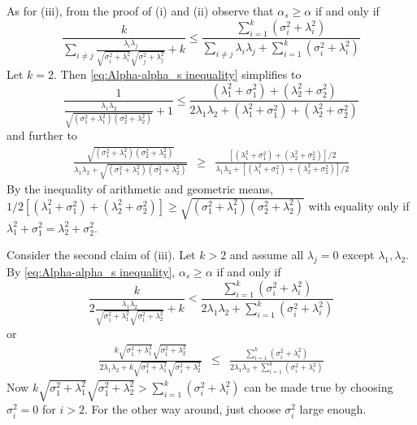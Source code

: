 \documentclass{article}
\makeatletter
\theoremstyle{plain}
\theoremstyle{plain}
\theoremstyle{definition}
\theoremstyle{remark}
\theoremstyle{definition}
\theoremstyle{plain}
\theoremstyle{plain}
\theoremstyle{definition}
\newenvironment{proof}[1][\protect\proofname]{\par
	\normalfont\topsep6\p@\@plus6\p@\relax
	\trivlist
	\itemindent\parindent
	\item[\hskip\labelsep\scshape #1]\ignorespaces
}{%
	\endtrivlist\@endpefalse
}
\providecommand{\proofname}{Proof}
\makeatother
\begin{document}
\begin{proof}[Proof of Proposition \ref{prop:Reliabilities.}]
As for (iii), from the proof of (i) and (ii) observe that $\alpha_{s}\geq\alpha$
if and only if
\begin{equation}
\label{eq:Alpha-alpha_s inequality}
\frac{k}{\sum_{i\neq j}\frac{\lambda_{i}\lambda_{j}}{\sqrt{\sigma_{i}^{2}+\lambda_{i}^{2}}\sqrt{\sigma_{j}^{2}+\lambda_{j}^{2}}}+k}\leq\frac{\sum_{i=1}^{k}\left(\sigma_{i}^{2}+\lambda_{i}^{2}\right)}{\sum_{i\neq j}\lambda_{i}\lambda_{j}+\sum_{i=1}^{k}\left(\sigma_{i}^{2}+\lambda_{i}^{2}\right)}
\end{equation}
Let $k=2$. Then \eqref{eq:Alpha-alpha_s inequality} simplifies to
\[
\frac{1}{\frac{\lambda_{1}\lambda_{2}}{\sqrt{\left(\sigma_{1}^{2}+\lambda_{1}^{2}\right)\left(\sigma_{2}^{2}+\lambda_{2}^{2}\right)}}+1}\leq\frac{\left(\lambda_{1}^{2}+\sigma_{1}^{2}\right)+\left(\lambda_{2}^{2}+\sigma_{2}^{2}\right)}{2\lambda_{1}\lambda_{2}+\left(\lambda_{1}^{2}+\sigma_{1}^{2}\right)+\left(\lambda_{2}^{2}+\sigma_{2}^{2}\right)}
\]
and further to
\begin{eqnarray*}
\frac{\sqrt{\left(\sigma_{1}^{2}+\lambda_{1}^{2}\right)\left(\sigma_{2}^{2}+\lambda_{2}^{2}\right)}}{\lambda_{1}\lambda_{2}+\sqrt{\left(\sigma_{1}^{2}+\lambda_{1}^{2}\right)\left(\sigma_{2}^{2}+\lambda_{2}^{2}\right)}} & \geq & \frac{\left[\left(\lambda_{1}^{2}+\sigma_{1}^{2}\right)+\left(\lambda_{2}^{2}+\sigma_{2}^{2}\right)\right]/2}{\lambda_{1}\lambda_{2}+\left[\left(\lambda_{1}^{2}+\sigma_{1}^{2}\right)+\left(\lambda_{2}^{2}+\sigma_{2}^{2}\right)\right]/2}
\end{eqnarray*}
By the inequality of arithmetic and geometric means, $1/2\left[\left(\lambda_{1}^{2}+\sigma_{1}^{2}\right)+\left(\lambda_{2}^{2}+\sigma_{2}^{2}\right)\right]\geq\sqrt{\left(\sigma_{1}^{2}+\lambda_{1}^{2}\right)\left(\sigma_{2}^{2}+\lambda_{2}^{2}\right)}$
with equality only if $\lambda_{1}^{2}+\sigma_{1}^{2}=\lambda_{2}^{2}+\sigma_{2}^{2}$.

Consider the second claim of (iii). Let $k>2$ and assume all $\lambda_{j}=0$
except $\lambda_{1},\lambda_{2}$. By \eqref{eq:Alpha-alpha_s inequality}, $\alpha_s \geq \alpha$ if and
only if
\[
\frac{k}{2\frac{\lambda_{1}\lambda_{2}}{\sqrt{\sigma_{1}^{2}+\lambda_{1}^{2}}\sqrt{\sigma_{1}^{2}+\lambda_{2}^{2}}}+k}<\frac{\sum_{i=1}^{k}\left(\sigma_{i}^{2}+\lambda_{i}^{2}\right)}{2\lambda_{1}\lambda_{2}+\sum_{i=1}^{k}\left(\sigma_{i}^{2}+\lambda_{i}^{2}\right)}
\]
or
\begin{eqnarray*}
\frac{k\sqrt{\sigma_{1}^{2}+\lambda_{1}^{2}}\sqrt{\sigma_{1}^{2}+\lambda_{2}^{2}}}{2\lambda_{1}\lambda_{2}+k\sqrt{\sigma_{1}^{2}+\lambda_{1}^{2}}\sqrt{\sigma_{1}^{2}+\lambda_{2}^{2}}} & \leq & \frac{\sum_{i=1}^{k}\left(\sigma_{i}^{2}+\lambda_{i}^{2}\right)}{2\lambda_{1}\lambda_{2}+\sum_{i=1}^{k}\left(\sigma_{i}^{2}+\lambda_{i}^{2}\right)}
\end{eqnarray*}
Now $k\sqrt{\sigma_{1}^{2}+\lambda_{1}^{2}}\sqrt{\sigma_{1}^{2}+\lambda_{2}^{2}}>\sum_{i=1}^{k}\left(\sigma_{i}^{2}+\lambda_{i}^{2}\right)$
can be made true by choosing $\sigma_{i}^{2}=0$ for $i>2$. For the
other way around, just choose $\sigma_{i}^{2}$ large enough.
\end{proof}
\end{document}
